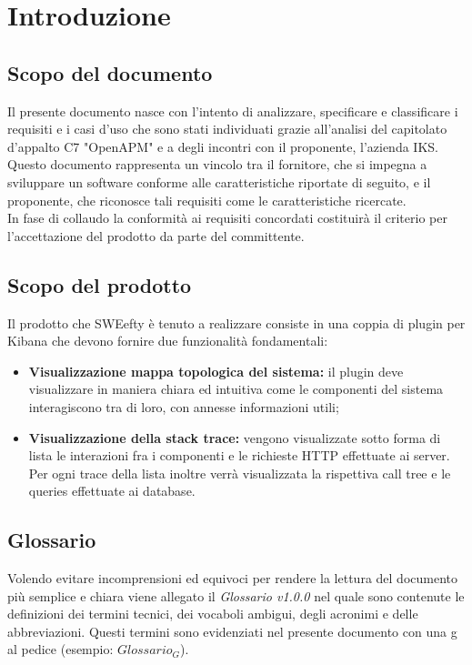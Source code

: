 \section{Introduzione}
	\subsection{Scopo del documento}
	Il presente documento nasce con l'intento di analizzare, specificare e classificare i requisiti e i casi d'uso che sono stati individuati grazie all'analisi del capitolato d'appalto C7 "OpenAPM" e a degli incontri con il proponente, l'azienda IKS.\\
	Questo documento rappresenta un vincolo tra il fornitore, che si impegna a sviluppare un software conforme alle caratteristiche riportate di seguito, e il proponente, che riconosce tali requisiti come le caratteristiche ricercate.\\
	In fase di collaudo la conformità ai requisiti concordati costituirà il criterio per l'accettazione del prodotto da parte del committente.

	\subsection{Scopo del prodotto}
	Il prodotto che SWEefty è tenuto a realizzare consiste in una coppia di plugin per Kibana che devono fornire due funzionalità fondamentali:
	\begin{itemize}
		\item \textbf{Visualizzazione mappa topologica del sistema:} il plugin deve visualizzare in maniera chiara ed intuitiva come le componenti del sistema interagiscono tra di loro, con annesse informazioni utili;
		\item \textbf{Visualizzazione della stack trace:} vengono visualizzate sotto forma di lista le interazioni fra i componenti e le richieste HTTP effettuate ai server. Per ogni trace della lista inoltre verrà visualizzata la rispettiva call tree e le queries effettuate ai database.
	\end{itemize}

	\subsection{Glossario}
		Volendo evitare incomprensioni  ed equivoci per rendere la lettura del documento più semplice e chiara viene allegato il \emph{Glossario v1.0.0} nel quale sono contenute le definizioni dei termini tecnici, dei vocaboli ambigui, degli acronimi e delle abbreviazioni. Questi termini sono evidenziati nel presente documento con una g al pedice (esempio: $Glossario_{G}$).
